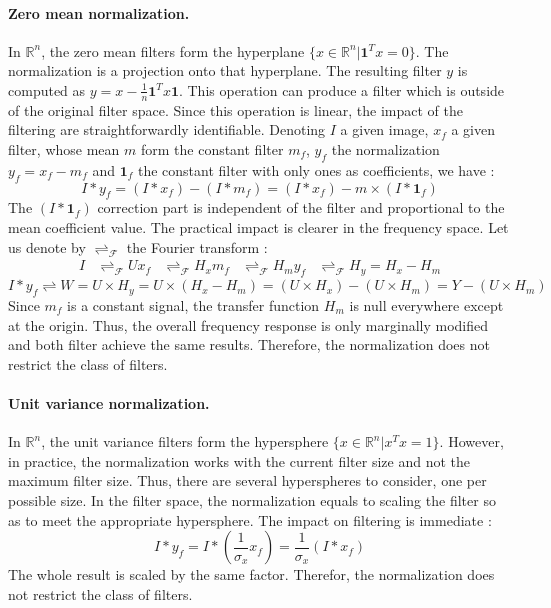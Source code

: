 \documentclass[a4paper]{report}
\begin{document}
			\paragraph{Zero mean normalization.}
			In $\mathbb{R}^n$, the zero mean filters form the hyperplane $\{x \in \mathbb{R}^n | \textbf{1}^{T}x = 0\}$. The normalization is a projection onto that hyperplane. The resulting filter $y$ is computed as $y = x - \frac{1}{n}\textbf{1}^{T}x\textbf{1}$. This operation can produce a filter which is outside of the original filter space.
			Since this operation is linear, the impact of the filtering are straightforwardly identifiable. Denoting $I$ a given image, $x_f$ a given filter, whose mean $m$ form the constant filter $m_f$, $y_f$ the normalization $ y_f = x_f - m_f$ and $\textbf{1}_f$ the constant filter with only ones as coefficients, we have : 
			\[
				I * y_f = (I * x_f) - (I * m_f) = (I * x_f) - m \times (I * \textbf{1}_f)
			\]
			The $(I * \textbf{1}_f)$ correction part is independent of the filter and proportional to the mean coefficient value. The practical impact is clearer in the frequency space. Let us denote by $\rightleftharpoons_\mathcal{F}$ the Fourier transform : 
			\begin{align*}
				I &\rightleftharpoons_\mathcal{F} U
				x_f &\rightleftharpoons_\mathcal{F} H_x
				m_f &\rightleftharpoons_\mathcal{F} H_m
				y_f &\rightleftharpoons_\mathcal{F} H_y = H_x - H_m
			\end{align*}
			\[
				I * y_f \rightleftharpoons W = U \times H_y = U \times (H_x - H_m) = (U \times H_x) - (U \times H_m) = Y - (U \times H_m)
			\]
			Since $m_f$ is a constant signal, the transfer function $H_m$ is null everywhere except at the origin. Thus, the overall frequency response is only marginally modified and both filter achieve the same results.
			Therefore, the normalization does not restrict the class of filters.
			
			\paragraph{Unit variance normalization.}
			In $\mathbb{R}^n$, the unit variance filters form the hypersphere $\{x \in \mathbb{R}^n | x^{T}x = 1\}$. However, in practice, the normalization works with the current filter size and not the maximum filter size. Thus, there are several hyperspheres to consider, one per possible size. 
			In the filter space, the normalization equals to scaling the filter so as to meet the appropriate hypersphere. The impact on filtering is immediate :
			\[
				I * y_f = I * (\frac{1}{\sigma_x} x_f) = \frac{1}{\sigma_x} (I * x_f)
			\]
			The whole result is scaled by the same factor. Therefor, the normalization does not restrict the class of filters.
			
\end{document}
